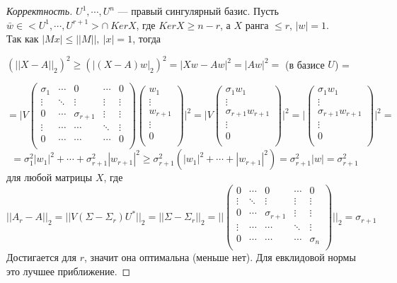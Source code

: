 \documentclass[12pt]{article}
\begin{document}
	\begin{proof}[Корректность]
	$U^1,\cdots, U^n$ --- правый сингулярный базис.
	Пусть $\bar w \in <U^1,\cdots,U^{r+1}> \cap~ Ker X$, где $Ker X \geqslant n-r$, а $X$ ранга $\leqslant r$, $|w|=1$.\\
	Так как $|Mx|\leqslant ||M||,~|x|=1$, тогда \begin{center}
		$(||X-A||_2)^2 \geqslant(|(X-A)w|_2)^2=|Xw-Aw|^2=|Aw|^2=$ (в базисе $U$) =
	\end{center}
	\[=\Bigg| V\begin{pmatrix}
	\sigma_1 & \cdots & 0  & \cdots & 0\\
	\vdots & \ddots & \vdots & \vdots & \vdots\\
	0 & \cdots & \sigma_{r+1} &  \vdots & \vdots\\
	\vdots & \cdots & \cdots & \ddots & \vdots\\
	0 & \cdots & \cdots & \cdots & 0\\
	\end{pmatrix} \begin{pmatrix}
	w_1\\
	\vdots\\
	w_{r+1}\\
	\vdots\\
	0\\
	\end{pmatrix}\Bigg|^2 =\Bigg|V \begin{pmatrix}
	\sigma_1 w_1\\
	\vdots\\
	\sigma_{r+1} w_{r+1}\\
	\vdots\\
	0\\
	\end{pmatrix} \Bigg|^2 =\Bigg| \begin{pmatrix}
	\sigma_1 w_1\\
	\vdots\\
	\sigma_{r+1} w_{r+1}\\
	\vdots\\
	0\\
	\end{pmatrix} \Bigg|^2=\]$$=\sigma_1^2|w_1|^2+\cdots+\sigma_{r+1}^2|w_{r+1}|^2 \geqslant \sigma_{r+1}^2(|w_1|^2+\cdots+|w_{r+1}|^2)=\sigma_{r+1}^2|w|=\sigma_{r+1}^2$$ для любой матрицы $X$, где 
	\[||A_r-A||_2=||V(\Sigma-\Sigma_r)U^*||_2=||\Sigma-\Sigma_r||_2 = \Bigg| \Bigg|\begin{pmatrix}
	0 & \cdots & 0  & \cdots & 0\\
	\vdots & \ddots & \vdots & \vdots & \vdots\\
	0 & \cdots & \sigma_{r+1} &  \vdots & \vdots\\
	\vdots & \cdots & \cdots & \ddots & \vdots\\
	0 & \cdots & \cdots & \cdots & \sigma_n\\
	\end{pmatrix}\Bigg|\Bigg|_2=\sigma_{r+1}\]
	Достигается для $r$, значит она оптимальна (меньше нет). Для евклидовой нормы это лучшее приближение.
	\end{proof}
\end{document}
